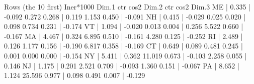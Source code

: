 \documentclass[
]{article}
\newenvironment{Shaded}{\begin{snugshade}}{\end{snugshade}}
\newcommand{\DecValTok}[1]{\textcolor[rgb]{0.00,0.00,0.81}{#1}}
\newcommand{\FloatTok}[1]{\textcolor[rgb]{0.00,0.00,0.81}{#1}}
\newcommand{\FunctionTok}[1]{\textcolor[rgb]{0.00,0.00,0.00}{#1}}
\newcommand{\NormalTok}[1]{#1}
\newcommand{\SpecialCharTok}[1]{\textcolor[rgb]{0.00,0.00,0.00}{#1}}
\begin{document}
\begin{Shaded}
\begin{Highlighting}[]
\FunctionTok{Rows}\NormalTok{ (the }\DecValTok{10}\NormalTok{ first)}
\NormalTok{             Iner}\SpecialCharTok{*}\DecValTok{1000}\NormalTok{    Dim}\FloatTok{.1}\NormalTok{    ctr   cos2    Dim}\FloatTok{.2}\NormalTok{    ctr   cos2    Dim}\FloatTok{.3}
\NormalTok{ME         }\SpecialCharTok{|}     \FloatTok{0.335} \SpecialCharTok{|} \SpecialCharTok{{-}}\FloatTok{0.092}  \FloatTok{0.272}  \FloatTok{0.268} \SpecialCharTok{|}  \FloatTok{0.119}  \FloatTok{1.153}  \FloatTok{0.450} \SpecialCharTok{|} \SpecialCharTok{{-}}\FloatTok{0.091}
\NormalTok{NH         }\SpecialCharTok{|}     \FloatTok{0.415} \SpecialCharTok{|} \SpecialCharTok{{-}}\FloatTok{0.029}  \FloatTok{0.025}  \FloatTok{0.020} \SpecialCharTok{|}  \FloatTok{0.098}  \FloatTok{0.734}  \FloatTok{0.231} \SpecialCharTok{|} \SpecialCharTok{{-}}\FloatTok{0.174}
\NormalTok{VT         }\SpecialCharTok{|}     \FloatTok{1.094} \SpecialCharTok{|} \SpecialCharTok{{-}}\FloatTok{0.020}  \FloatTok{0.013}  \FloatTok{0.004} \SpecialCharTok{|}  \FloatTok{0.256}  \FloatTok{5.522}  \FloatTok{0.660} \SpecialCharTok{|} \SpecialCharTok{{-}}\FloatTok{0.167}
\NormalTok{MA         }\SpecialCharTok{|}     \FloatTok{4.467} \SpecialCharTok{|}  \FloatTok{0.324}  \FloatTok{6.895}  \FloatTok{0.510} \SpecialCharTok{|} \SpecialCharTok{{-}}\FloatTok{0.161}  \FloatTok{4.280}  \FloatTok{0.125} \SpecialCharTok{|} \SpecialCharTok{{-}}\FloatTok{0.252}
\NormalTok{RI         }\SpecialCharTok{|}     \FloatTok{2.489} \SpecialCharTok{|}  \FloatTok{0.126}  \FloatTok{1.177}  \FloatTok{0.156} \SpecialCharTok{|} \SpecialCharTok{{-}}\FloatTok{0.190}  \FloatTok{6.817}  \FloatTok{0.358} \SpecialCharTok{|} \SpecialCharTok{{-}}\FloatTok{0.169}
\NormalTok{CT         }\SpecialCharTok{|}     \FloatTok{0.649} \SpecialCharTok{|}  \FloatTok{0.089}  \FloatTok{0.481}  \FloatTok{0.245} \SpecialCharTok{|}  \FloatTok{0.001}  \FloatTok{0.000}  \FloatTok{0.000} \SpecialCharTok{|} \SpecialCharTok{{-}}\FloatTok{0.154}
\NormalTok{NY         }\SpecialCharTok{|}     \FloatTok{5.411} \SpecialCharTok{|}  \FloatTok{0.362} \FloatTok{11.019}  \FloatTok{0.673} \SpecialCharTok{|} \SpecialCharTok{{-}}\FloatTok{0.103}  \FloatTok{2.258}  \FloatTok{0.055} \SpecialCharTok{|}  \FloatTok{0.146}
\NormalTok{NJ         }\SpecialCharTok{|}     \FloatTok{1.175} \SpecialCharTok{|}  \FloatTok{0.201}  \FloatTok{2.521}  \FloatTok{0.709} \SpecialCharTok{|} \SpecialCharTok{{-}}\FloatTok{0.093}  \FloatTok{1.360}  \FloatTok{0.151} \SpecialCharTok{|} \SpecialCharTok{{-}}\FloatTok{0.067}
\NormalTok{PA         }\SpecialCharTok{|}     \FloatTok{8.652} \SpecialCharTok{|}  \FloatTok{1.124} \FloatTok{25.596}  \FloatTok{0.977} \SpecialCharTok{|}  \FloatTok{0.098}  \FloatTok{0.491}  \FloatTok{0.007} \SpecialCharTok{|} \SpecialCharTok{{-}}\FloatTok{0.129}

\end{Highlighting}
\end{Shaded}
\end{document}
